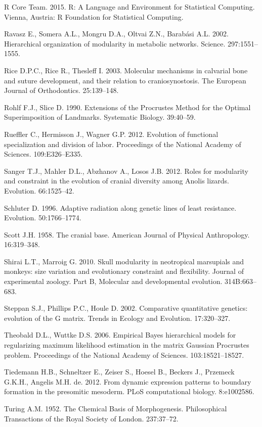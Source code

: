 \documentclass[12pt,]{article}
\begin{document}
R Core Team. 2015. R: A Language and Environment for Statistical
Computing. Vienna, Austria: R Foundation for Statistical Computing.

Ravasz E., Somera A.L., Mongru D.A., Oltvai Z.N., Barabási A.L. 2002.
Hierarchical organization of modularity in metabolic networks. Science.
297:1551--1555.

Rice D.P.C., Rice R., Thesleff I. 2003. Molecular mechanisms in
calvarial bone and suture development, and their relation to
craniosynostosis. The European Journal of Orthodontics. 25:139--148.

Rohlf F.J., Slice D. 1990. Extensions of the Procrustes Method for the
Optimal Superimposition of Landmarks. Systematic Biology. 39:40--59.

Rueffler C., Hermisson J., Wagner G.P. 2012. Evolution of functional
specialization and division of labor. Proceedings of the National
Academy of Sciences. 109:E326--E335.

Sanger T.J., Mahler D.L., Abzhanov A., Losos J.B. 2012. Roles for
modularity and constraint in the evolution of cranial diversity among
Anolis lizards. Evolution. 66:1525--42.

Schluter D. 1996. Adaptive radiation along genetic lines of least
resistance. Evolution. 50:1766--1774.

Scott J.H. 1958. The cranial base. American Journal of Physical
Anthropology. 16:319--348.

Shirai L.T., Marroig G. 2010. Skull modularity in neotropical marsupials
and monkeys: size variation and evolutionary constraint and flexibility.
Journal of experimental zoology. Part B, Molecular and developmental
evolution. 314B:663--683.

Steppan S.J., Phillips P.C., Houle D. 2002. Comparative quantitative
genetics: evolution of the G matrix. Trends in Ecology and Evolution.
17:320--327.

Theobald D.L., Wuttke D.S. 2006. Empirical Bayes hierarchical models for
regularizing maximum likelihood estimation in the matrix Gaussian
Procrustes problem. Proceedings of the National Academy of Sciences.
103:18521--18527.

Tiedemann H.B., Schneltzer E., Zeiser S., Hoesel B., Beckers J.,
Przemeck G.K.H., Angelis M.H. de. 2012. From dynamic expression patterns
to boundary formation in the presomitic mesoderm. PLoS computational
biology. 8:e1002586.

Turing A.M. 1952. The Chemical Basis of Morphogenesis. Philosophical
Transactions of the Royal Society of London. 237:37--72.
\end{document}
